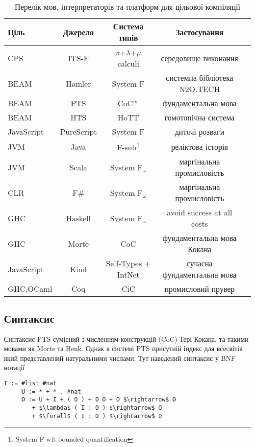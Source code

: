 \begin{table}[h]
\begin{center}
\caption{Перелік мов, інтерпретаторів та платформ для цільової компіляції}
\begin{tabular}{lcccc}
\hline
\textbf{Ціль} & \textbf{Джерело} & \textbf{Система типів} & \textbf{Застосування}\\
\hline
\rowcolor{LightGray}
CPS        & ITS-F      & $\pi$+$\lambda$+$\mu$ calculi & середовище виконання \\
\rowcolor{LightGray}
BEAM       & Hamler     & System F            & системна бібліотека N2O.TECH \\
\rowcolor{LightGray}
BEAM       & PTS        & CoC$^\infty$        & фундаментальна мова \\
\rowcolor{LightGray}
BEAM       & HTS        & HoTT                & гомотопічна система \\
\hline
JavaScript & PureScript & System F & дитячі розваги \\
JVM        & Java       & F-sub\footnote{System F wit bounded quantification} & реліктова історія \\
JVM        & Scala      & System F$_\omega$   & маргінальна промисловість \\
CLR        & F\#        & System F$_\omega$   & маргінальна промисловість \\
GHC        & Haskell    & System F$_\omega$   & avoid success at all costs \\
GHC        & Morte      & CoC                 & фундаментальна мова Кокана \\
JavaScript & Kind       & Self-Types + IntNet & сучасна фундаментальна мова \\
GHC,OCaml  & Coq        & CiC                 & промисловий прувер \\
\hline
\end{tabular}
\end{center}
\end{table}

\subsection{Синтаксис}
Синтаксис PTS сумісний з численням конструкцій (CoC) Тері Кокана,
та такими мовами як Morte та Henk.
Однак в системі PTS присутній індекс для всесвітів який
представлений натуральними числами. Тут наведений синтаксис у BNF нотації

\begin{lstlisting}[mathescape=true]
     I := #list #nat
     U := * + * . #nat
     O := U + I + ( O ) + O O + O $\rightarrow$ O
        + $\lambda$ ( I : O ) $\rightarrow$ O
        + $\forall$ ( I : O ) $\rightarrow$ O
\end{lstlisting}


